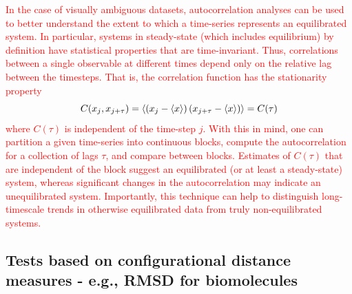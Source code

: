 \textcolor{red}{In the case of visually ambiguous datasets, autocorrelation analyses can be used to better understand the extent to which a time-series represents an equilibrated system.  In particular, systems in steady-state (which includes equilibrium) by definition have statistical properties that are time-invariant.  Thus, correlations between a single observable at different times depend only on the relative lag between the timesteps.  That is, the correlation function has the stationarity property}
%
\begin{equation}
 C(x_j,x_{j+\tau}) = \left< \left(x_j - \langle x \rangle \right) \left(x_{j+\tau} - \langle x \rangle \right) \right> = C(\tau)
\end{equation}
%
\textcolor{red}{where $C(\tau)$ is independent of the time-step $j$.  With this in mind, one can partition a given time-series into continuous blocks, compute the autocorrelation for a collection of lags $\tau$, and compare between blocks.  Estimates of $C(\tau)$ that are independent of the block suggest an equilibrated (or at least a steady-state) system, whereas significant changes in the autocorrelation may indicate an unequilibrated system.  Importantly, this technique can help to distinguish long-timescale trends in otherwise equilibrated data from truly non-equilibrated systems.}

\subsection{Tests based on configurational distance measures - e.g., RMSD for biomolecules}
\label{sec:bio_RMSD}

